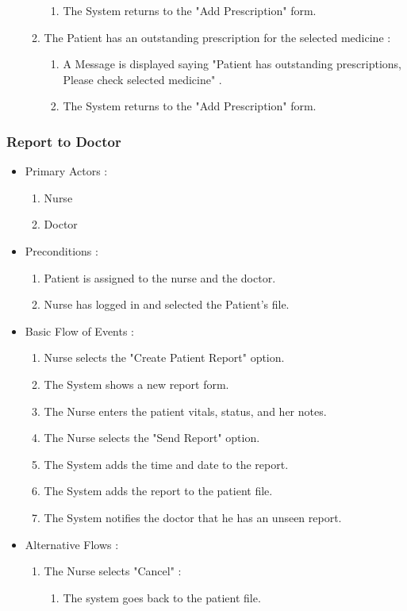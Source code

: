 \documentclass[14pt]{article}
\begin{document}
\begin{itemize}
\begin{enumerate}
\begin{enumerate}
						\item The System returns to the "Add Prescription" form.
					\end{enumerate}
				\item The Patient has an outstanding prescription for the selected medicine :
					\begin{enumerate}
						\item A Message is displayed saying "Patient has outstanding prescriptions, Please check selected medicine" . 
						\item The System returns to the "Add Prescription" form.
					\end{enumerate}
			\end{enumerate}
\end{itemize}
\newpage
\subsubsection{Report to Doctor}
\begin{itemize}
		\item Primary Actors : 
			\begin{enumerate}
				\item Nurse
				\item Doctor
			\end{enumerate}
		\item Preconditions :
			\begin{enumerate}
				\item Patient is assigned to the nurse and the doctor.
				\item Nurse has logged in and selected the Patient's file.
			\end{enumerate}
		\item Basic Flow of Events :
			\begin{enumerate}
				\item Nurse selects the "Create Patient Report" option.
				\item The System shows a new report form.
				\item The Nurse enters the patient vitals, status, and her notes.
				\item The Nurse selects the "Send Report" option.
				\item The System adds the time and date to the report.
				\item The System adds the report to the patient file.
				\item The System notifies the doctor that he has an unseen report.	
			\end{enumerate}
		\item Alternative Flows :
			\begin{enumerate}
				\item The Nurse selects "Cancel" : 
					\begin{enumerate}
						\item The system goes back to the patient file.
					\end{enumerate}
			\end{enumerate}
\end{itemize}
\end{document}
